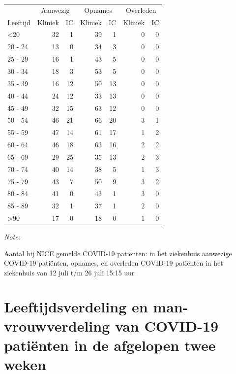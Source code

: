 \documentclass[
  english,
  man,floatsintext]{apa6}
\begin{document}
\begin{table}
\centering\begingroup\fontsize{10}{12}\selectfont

\begin{threeparttable}
\begin{tabular}{lrrrrrr}
\toprule
\multicolumn{1}{c}{ } & \multicolumn{2}{c}{Aanwezig} & \multicolumn{2}{c}{Opnames} & \multicolumn{2}{c}{Overleden} \\
\cmidrule(l{3pt}r{3pt}){2-3} \cmidrule(l{3pt}r{3pt}){4-5} \cmidrule(l{3pt}r{3pt}){6-7}
Leeftijd & Kliniek & IC & Kliniek & IC & Kliniek & IC\\
\midrule
<20 & 32 & 1 & 39 & 1 & 0 & 0\\
20 - 24 & 13 & 0 & 34 & 3 & 0 & 0\\
25 - 29 & 16 & 1 & 43 & 5 & 0 & 0\\
30 - 34 & 18 & 3 & 53 & 5 & 0 & 0\\
35 - 39 & 16 & 12 & 50 & 13 & 0 & 0\\
40 - 44 & 24 & 12 & 33 & 13 & 0 & 0\\
45 - 49 & 32 & 15 & 63 & 12 & 0 & 0\\
50 - 54 & 46 & 21 & 66 & 20 & 3 & 1\\
55 - 59 & 47 & 14 & 61 & 17 & 1 & 2\\
60 - 64 & 46 & 18 & 63 & 16 & 2 & 2\\
65 - 69 & 29 & 25 & 35 & 13 & 2 & 3\\
70 - 74 & 40 & 14 & 38 & 5 & 1 & 3\\
75 - 79 & 43 & 7 & 50 & 9 & 3 & 2\\
80 - 84 & 41 & 0 & 43 & 1 & 3 & 0\\
85 - 89 & 32 & 1 & 37 & 1 & 2 & 0\\
>90 & 17 & 0 & 18 & 0 & 1 & 0\\
\bottomrule
\end{tabular}
\begin{tablenotes}
\item \textit{Note: } 
\item Aantal bij NICE gemelde COVID-19 patiënten: in het ziekenhuis aanwezige COVID-19 patiënten, opnames, en overleden COVID-19 patiënten in het ziekenhuis van 12 juli t/m 26 juli 15:15 uur
\end{tablenotes}
\end{threeparttable}
\endgroup{}
\end{table}

\newpage

\hypertarget{leeftijdsverdeling-en-man-vrouwverdeling-van-covid-19-patiuxebnten-in-de-afgelopen-twee-weken}{%
\section{Leeftijdsverdeling en man-vrouwverdeling van COVID-19 patiënten in de afgelopen twee weken}\label{leeftijdsverdeling-en-man-vrouwverdeling-van-covid-19-patiuxebnten-in-de-afgelopen-twee-weken}}
\end{document}
